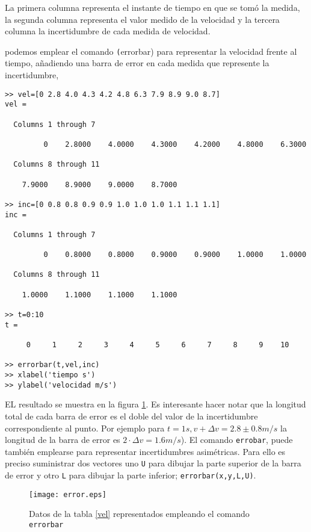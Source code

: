 La primera columna representa el instante de tiempo en que se tomó la medida, la segunda columna representa el valor medido de la velocidad y la tercera columna la incertidumbre de cada medida de velocidad.

podemos emplear el comando \texttt(errorbar) para representar la velocidad frente al tiempo, añadiendo una barra de error en cada medida que represente la incertidumbre,

\begin{verbatim}
>> vel=[0 2.8 4.0 4.3 4.2 4.8 6.3 7.9 8.9 9.0 8.7]
vel =

  Columns 1 through 7

         0    2.8000    4.0000    4.3000    4.2000    4.8000    6.3000

  Columns 8 through 11

    7.9000    8.9000    9.0000    8.7000

>> inc=[0 0.8 0.8 0.9 0.9 1.0 1.0 1.0 1.1 1.1 1.1]
inc =

  Columns 1 through 7

         0    0.8000    0.8000    0.9000    0.9000    1.0000    1.0000

  Columns 8 through 11

    1.0000    1.1000    1.1000    1.1000

>> t=0:10
t =

     0     1     2     3     4     5     6     7     8     9    10

>> errorbar(t,vel,inc)
>> xlabel('tiempo s')
>> ylabel('velocidad m/s')
\end{verbatim}

EL resultado se muestra en la figura \ref{fig:error}. Es interesante hacer notar que la longitud total de cada barra de error es el doble del valor de la incertidumbre correspondiente al punto. Por ejemplo para $t=1s, v+\Delta v=2.8\pm 0.8 m/s$ la longitud de la barra de error es $2\cdot \Delta v=1.6 m/s$). El comando \texttt{errobar}, puede también emplearse para representar incertidumbres asimétricas. Para ello  es preciso suministrar dos vectores uno \texttt{U} para dibujar la parte superior de la barra de error y otro \texttt{L} para dibujar la parte inferior; \texttt{errorbar(x,y,L,U)}. 

\begin{figure}[h]
\centering
\texttt{[image: error.eps]}
\caption{Datos de la tabla \ref{vel} representados empleando el comando \texttt{errorbar}}
\label{fig:error}
\end{figure}

